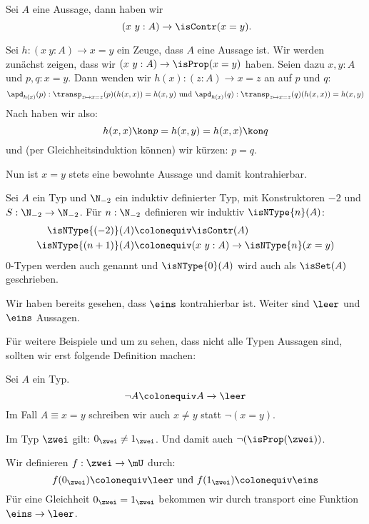 \begin{lemma}
  \label{prop-id-contractible}
  Sei $A$ eine Aussage, dann haben wir
  \[
    (x\ y :A)\to \isContr(x=y)\rlap{.}
  \]
\end{lemma}

\begin{beweis}
  Sei $h:(x\ y : A)\to x=y$ ein Zeuge, dass $A$ eine Aussage ist.
  Wir werden zunächst zeigen, dass wir $(x\ y : A)\to \isProp(x=y)$ haben.
  Seien dazu $x,y:A$ und $p,q:x=y$. Dann wenden wir $h(x):(z:A)\to x=z$ an auf $p$ und $q$:
  \[
  \apd_{h(x)}(p):\transp_{z\mapsto x=z}(p)(h(x,x))=h(x,y)\text{ und }
  \apd_{h(x)}(q):\transp_{z\mapsto x=z}(q)(h(x,x))=h(x,y)
  \]
  Nach  haben wir also:
  \[
    h(x,x)\kon p=h(x,y)=h(x,x)\kon q
  \]
  und (per Gleichheitsinduktion können) wir kürzen: $p=q$.

  Nun ist $x=y$ stets eine bewohnte Aussage und damit kontrahierbar.
\end{beweis}

\begin{definition}
  Sei $A$ ein Typ und $\N_{-2}$ ein induktiv definierter Typ,
  mit Konstruktoren $-2$ und $S:\N_{-2}\to\N_{-2}$.
  Für $n:\N_{-2}$ definieren wir induktiv $\isNType{n}(A)$:
  \begin{align*}
    \isNType{(-2)}(A)&\colonequiv \isContr(A) \\
    \isNType{(n+1)}(A)&\colonequiv (x\ y : A)\to \isNType{n}(x=y)
  \end{align*}
  $0$-Typen werden auch  genannt und $\isNType{0}(A)$ wird auch als $\isSet(A)$ geschrieben.
\end{definition}

\begin{beispiel}
  Wir haben bereits gesehen, dass $\eins$ kontrahierbar ist.
  Weiter sind $\leer$ und $\eins$ Aussagen.
\end{beispiel}

Für weitere Beispiele und um zu sehen, dass nicht alle Typen Aussagen sind, sollten wir erst folgende Definition machen:

\begin{definition}
  Sei $A$ ein Typ.
  \[
    \neg A\colonequiv A\to\leer
    \]
    Im Fall $A\equiv x=y$ schreiben wir auch $x\neq y$ statt $\neg(x=y)$.
\end{definition}

\begin{bemerkung}
  Im Typ $\zwei$ gilt: $0_\zwei\neq 1_\zwei$. Und damit auch $\neg(\isProp(\zwei))$.
\end{bemerkung}
\begin{beweis}
  Wir definieren $f:\zwei\to\mU$ durch:
  \[
    f(0_\zwei)\colonequiv \leer\text{ und }f(1_\zwei)\colonequiv \eins
    \]
    Für eine Gleichheit $0_\zwei=1_\zwei$ bekommen wir durch transport eine Funktion $\eins\to\leer$.
\end{beweis}

